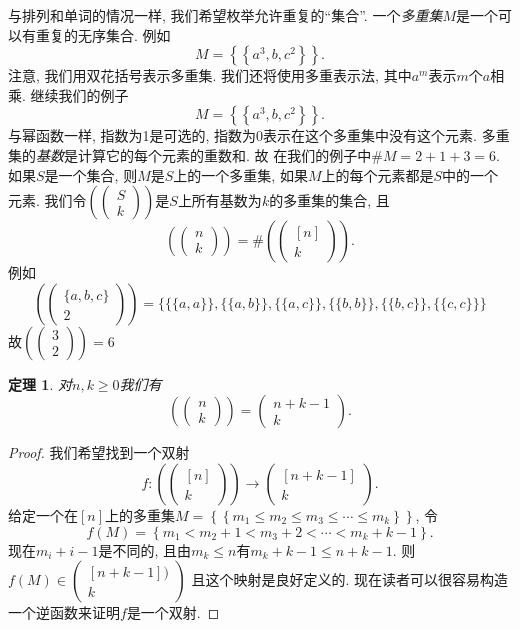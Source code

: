 \documentclass{ctexbook}
\newtheorem{thm}{定理}[section]
\begin{document}
与排列和单词的情况一样, 我们希望枚举允许重复的“集合”. 一个\textsl{多重集}$M$是一个可以有重复的无序集合. 例如
$$
M=\left\{\left\{a^{3}, b, c^{2}\right\}\right\}.
$$
注意, 我们用双花括号表示多重集. 我们还将使用多重表示法, 其中$a^{m}$表示$m$个$a$相乘. 继续我们的例子
$$
M=\left\{\left\{a^{3}, b, c^{2}\right\}\right\}.
$$
与幂函数一样, 指数为1是可选的, 指数为0表示在这个多重集中没有这个元素. 多重集的\textsl{基数}是计算它的每个元素的重数和. 故
在我们的例子中$\# M=2+1+3=6$. 如果$S$是一个集合, 则$M$是$S$上的一个多重集, 如果$M$上的每个元素都是$S$中的一个元素.
我们令$\left(\left(\begin{array}{c}S \\ k\end{array}\right)\right)$是$S$上所有基数为$k$的多重集的集合, 且
$$
\left(\left(\begin{array}{l}
n \\ k
\end{array}\right)\right)=\#\left(\left(\begin{array}{c}
{[n]} \\ k
\end{array}\right)\right).
$$
例如
$$
\left(\left(\begin{array}{c}
\{a, b, c\} \\ 2
\end{array}\right)\right)=\{\{\{a, a\}\},\{\{a, b\}\},\{\{a, c\}\},\{\{b, b\}\},\{\{b, c\}\},\{\{c, c\}\}\}
$$
故$\left(\left(\begin{array}{l}3 \\ 2\end{array}\right)\right)=6$
   \begin{thm}
   	对$n, k \geqslant 0$我们有
   	$$
   	\left(\left(\begin{array}{l}
   	n \\ k
   	\end{array}\right)\right)=\left(\begin{array}{c}
   	n+k-1 \\ k
   	\end{array}\right).
   	$$
   \end{thm}
   \begin{proof}
   	我们希望找到一个双射
   	$$
   	f:\left(\left(\begin{array}{c}
   	{[n]} \\ k
   	\end{array}\right)\right) \rightarrow\left(\begin{array}{c}
   	{[n+k-1]} \\ k
   	\end{array}\right).
   	$$
   	给定一个在$[n]$上的多重集$M=\left\{\left\{m_{1} \leqslant m_{2} \leqslant m_{3} \leqslant \cdots \leqslant m_{k}\right\}\right\}$, 令
   	$$
   	f(M)=\left\{m_{1}<m_{2}+1<m_{3}+2<\cdots<m_{k}+k-1\right\}.
   	$$
   	现在$m_{i}+i-1$是不同的, 且由$m_{k} \leqslant n$有$m_{k}+k-1 \leqslant n+k-1$. 则$f(M) \in\left(\begin{array}{c}[n+k-1]) \\ k\end{array}\right)$
   	且这个映射是良好定义的. 现在读者可以很容易构造一个逆函数来证明$f$是一个双射.
   \end{proof}
\end{document}
